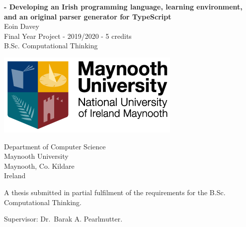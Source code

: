 \begin{titlepage}
    \begin{center}
        \begin{LARGE}
        \textbf{\Setanta{} - Developing an Irish programming language, learning environment, and an original parser generator for TypeScript}\\
            Eoin Davey\\
        Final Year Project - 2019/2020 - 5 credits\\
        B.Sc. Computational Thinking\\

        \vspace{10mm}

        \includegraphics[scale=0.66]{maynoothlogo}

        \vspace{25mm}

        Department of Computer Science\\
        Maynooth University\\
        Maynooth, Co. Kildare\\
        Ireland
        \end{LARGE}

        \vspace{20mm}

        \begin{large}A thesis submitted in partial fulfilment of the requirements for the B.Sc. Computational Thinking.\end{large}

        \begin{LARGE}Supervisor: Dr.\ Barak A. Pearlmutter.\end{LARGE}
    \end{center}
\end{titlepage}

